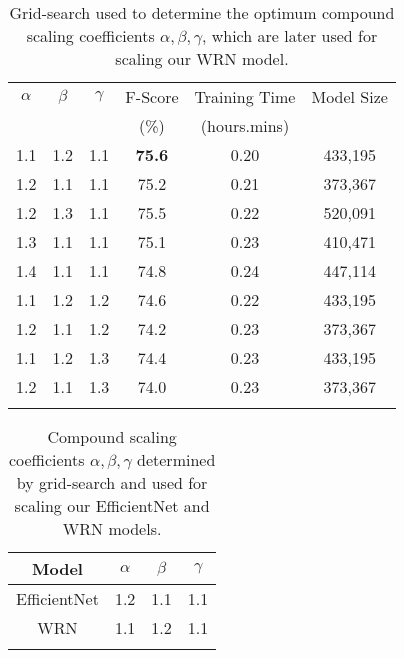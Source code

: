 \documentclass[journal]{IEEEtran}
\begin{document}
\begin{table}[b]
    \centering
    \begin{tabular}{ c c c c c c}
    \toprule
        \multirow{1}{*}{{$\alpha$}} & $\beta$ & $\gamma$ & F-Score & Training Time  & Model Size \\
        & & & (\%) & (hours.mins) & \\
        \hline
        1.1 & 1.2 & 1.1 & \textbf{75.6} & 0.20 & 433,195\\
        \hline
        1.2 & 1.1 & 1.1 & 75.2 & 0.21 & 373,367\\
        \hline
        1.2 & 1.3 & 1.1 & 75.5 & 0.22 & 520,091\\
        \hline
        1.3 & 1.1 & 1.1 & 75.1 & 0.23 & 410,471\\
        \hline
        1.4 & 1.1 & 1.1 & 74.8 & 0.24 & 447,114\\
        \hline
        1.1 & 1.2 & 1.2 & 74.6 & 0.22 & 433,195\\
        \hline
        1.2 & 1.1 & 1.2 & 74.2 & 0.23 & 373,367\\
        \hline
        1.1 & 1.2 & 1.3 & 74.4 & 0.23 & 433,195\\
        \hline
        1.2 & 1.1 & 1.3 & 74.0 & 0.23 & 373,367\\
        \hline
        \bottomrule\\
    \end{tabular}
    \caption{ Grid-search used to determine the optimum compound scaling coefficients $\alpha, \beta, \gamma$, which are later used for scaling our WRN model.} 
    \label{tab:WRNScalingCoeff}
\end{table}

\begin{table}[b]
    \centering
    \begin{tabular}{ c c c c}
    \toprule
        Model & $\alpha$ & $\beta$ & $\gamma$ \\
        \hline
        EfficientNet & 1.2 & 1.1 & 1.1 \\
        \hline
        WRN & 1.1 & 1.2 & 1.1\\
        \hline
        \bottomrule\\
    \end{tabular}
    \caption{Compound scaling coefficients $\alpha, \beta, \gamma$ determined by grid-search and used for scaling our EfficientNet and WRN models.} 
    \label{tab:CompScalingCoeff}
\end{table}
\end{document}
